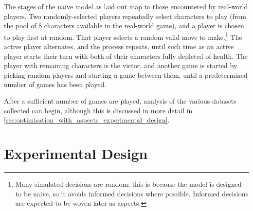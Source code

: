 The stages of the naive model as laid out map to those encountered by real-world
players. Two randomly-selected players repeatedly select characters to play
(from the pool of 8 characters available in the real-world game), and a player
is chosen to play first at random. That player selects a random valid move to
make.\footnote{Many simulated decisions are random; this is because the model is
designed to be naive, so it avoids informed decisions where possible. Informed
decisions are expected to be woven later as aspects.} The active player alternates, and the process repeats, until
such time as an active player starts their turn with both of their characters
fully depleted of health. The player with remaining characters is the victor,
and another game is started by picking random players and starting a game
between them, until a predetermined number of games has been played.

After a sufficient number of games are played, analysis of the various datasets
collected can begin, although this is discussed in more detail in
\cref{sec:optimisation_with_aspects_experimental_design}.




\section{Experimental Design}\label{sec:optimisation_with_aspects_experimental_introduction}



